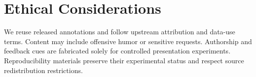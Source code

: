 \documentclass[11pt]{article}
\begin{document}
\section*{Ethical Considerations}
We reuse released annotations and follow upstream attribution and data-use terms. Content may include offensive humor or sensitive requests. Authorship and feedback cues are fabricated solely for controlled presentation experiments. Reproducibility materials preserve their experimental status and respect source redistribution restrictions.


\clearpage
\appendix



\end{document}

